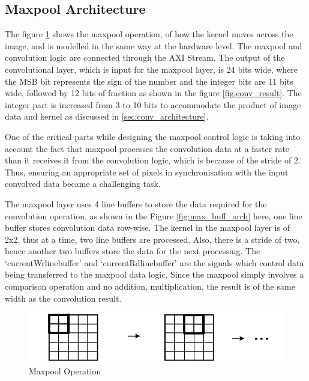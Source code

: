     \subsection{Maxpool Architecture}
    \noindent
    The figure \ref{fig:maxpool_operation} shows the maxpool operation, of how the kernel moves across the image, and is modelled in the same way at the hardware level. The maxpool and convolution logic are connected through the AXI  Stream. The output of the convolutional layer, which is input for the maxpool layer, is 24 bits wide, where the MSB bit represents the sign of the number and the integer bits are 11 bits wide, followed by 12 bits of fraction as shown in the figure \ref{fig:conv_result}. The integer part is increased from 3 to 10 bits to accommodate the product of image data and kernel as discussed in \ref{sec:conv_architecture}. 
    \par \noindent
    One of the critical parts while designing the maxpool control logic is taking into account the fact that maxpool processes the convolution data at a faster rate than it receives it from the convolution logic, which is because of the stride of 2. Thus, ensuring an appropriate set of pixels in synchronisation with the input convolved data became a challenging task.
    \par \noindent
    The maxpool layer uses 4 line buffers to store the data required for the convolution operation, as shown in the Figure \ref{fig:max_buff_arch} here, one line buffer stores convolution data row-wise.  The kernel in the maxpool layer is of 2x2, thus at a time, two line buffers are processed. Also, there is a stride of two, hence another two buffers store the data for the next processing. The ‘currentWrlinebuffer’ and ‘currentRdlinebuffer’ are the signals which control data being transferred to the maxpool data logic. Since the maxpool simply involves a comparison operation and no addition, multiplication, the result is of the same width as the convolution result.
    
     \begin{figure}[ht]
        \centering
        \includegraphics[width=0.75\linewidth]{images/maxpool.png}
        \caption{Maxpool Operation}
        \label{fig:maxpool_operation}
    \end{figure}
    
